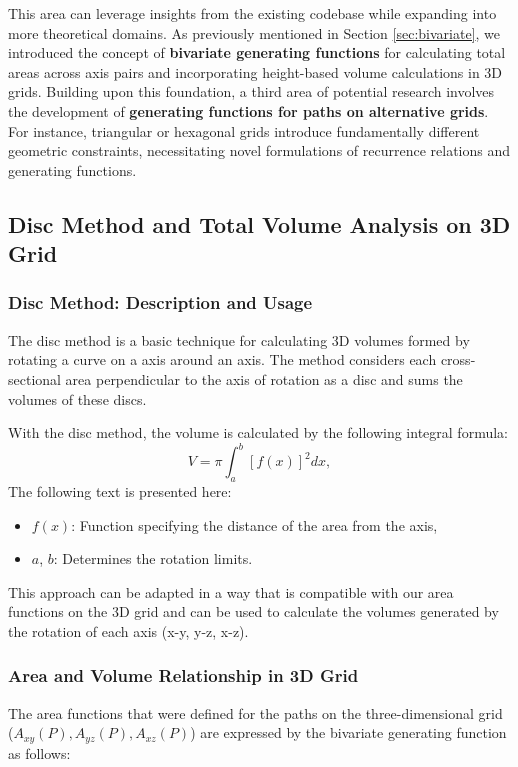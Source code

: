 \documentclass{article}
\begin{document}
This area can leverage insights from the existing codebase while expanding into more theoretical domains.
As previously mentioned in Section \ref{sec:bivariate}, we introduced the concept of \textbf{bivariate generating functions} for calculating total areas across axis pairs and incorporating height-based volume calculations in 3D grids. Building upon this foundation, a third area of potential research involves the development of \textbf{generating functions for paths on alternative grids}. For instance, triangular or hexagonal grids introduce fundamentally different geometric constraints, necessitating novel formulations of recurrence relations and generating functions.

\subsection{Disc Method and Total Volume Analysis on 3D Grid}

\subsubsection{Disc Method: Description and Usage}

The disc method is a basic technique for calculating 3D volumes formed by rotating a curve on a axis around an axis. The method considers each cross-sectional area perpendicular to the axis of rotation as a disc and sums the volumes of these discs.

With the disc method, the volume is calculated by the following integral formula:
\[
V = \pi \int_{a}^{b} \left[f(x)\right]^2 dx,
\]
The following text is presented here:
\begin{itemize}
    \item \( f(x) \): Function specifying the distance of the area from the axis,
    \item \( a \), \( b \): Determines the rotation limits.
\end{itemize}

This approach can be adapted in a way that is compatible with our area functions on the 3D grid and can be used to calculate the volumes generated by the rotation of each axis (x-y, y-z, x-z).

\subsubsection{Area and Volume Relationship in 3D Grid}

The area functions that were defined for the paths on the three-dimensional grid (\( A_{xy}(P), A_{yz}(P), A_{xz}(P) \)) are expressed by the bivariate generating function as follows:
\end{document}
